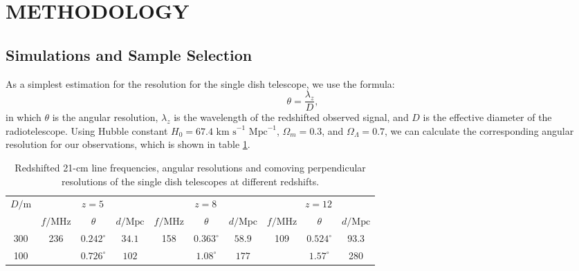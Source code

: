 \section{METHODOLOGY}
\subsection{Simulations and Sample Selection}
As a simplest estimation for the resolution for the single dish telescope, we use the formula:
\begin{equation}
    \theta = \frac{\lambda_z}{D},
\end{equation}
in which $\theta$ is the angular resolution, $\lambda_z$ is the wavelength of the redshifted observed signal, and $D$ is the effective diameter of the radiotelescope. Using Hubble constant $ H_0 = 67.4 \text{ km s}^{-1} \text{ Mpc}^{-1}$, $\Omega_m = 0.3$, and $\Omega_\Lambda = 0.7$, we can calculate the corresponding angular resolution for our observations, which is shown in table \ref{tab:angular_resolution}.

\begin{table}[h]
    \caption{Redshifted 21-cm line frequencies, angular resolutions and comoving perpendicular resolutions of the single dish telescopes at different redshifts.}
    \label{tab:angular_resolution}
    \centering
    \begin{tabular}{cccccccccc}
        \toprule
        \multirow{2}{*}{$D/\text{m}$}&\multicolumn{3}{c}{$z=5$}&\multicolumn{3}{c}{$z=8$}&\multicolumn{3}{c}{$z=12$}\\
        \cmidrule(lr){2-10}
        &$f/\text{MHz}$&$\theta$&$d/\text{Mpc}$&$f/\text{MHz}$&$\theta$&$d/\text{Mpc}$&$f/\text{MHz}$&$\theta$&$d/\text{Mpc}$\\
        \midrule
        300         &\multirow{2}{*}{236}&$0.242^\circ$&$34.1$&\multirow{2}{*}{158}&$0.363^\circ$& $58.9$&\multirow{2}{*}{109}&$0.524^\circ$&93.3\\
        100         &&$0.726^\circ$&$102$ &&$1.08^\circ$& $177$&&$1.57^\circ$&280\\
        \bottomrule
    \end{tabular}
\end{table}

